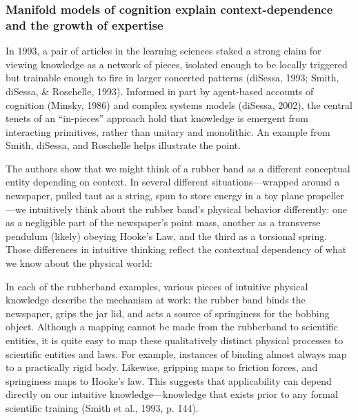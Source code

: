 \subsubsection{Manifold models of cognition explain context-dependence
and the growth of
expertise}\label{manifold-models-of-cognition-explain-context-dependence-and-the-growth-of-expertise}

In 1993, a pair of articles in the learning sciences staked a strong
claim for viewing knowledge as a network of pieces, isolated enough to
be locally triggered but trainable enough to fire in larger concerted
patterns (diSessa, 1993; Smith, diSessa, \& Roschelle, 1993). Informed
in part by agent-based accounts of cognition (Minsky, 1986) and complex
systems models (diSessa, 2002), the central tenets of an ``in-pieces''
approach hold that knowledge is emergent from interacting primitives,
rather than unitary and monolithic. An example from Smith, diSessa, and
Roschelle helps illustrate the point.

The authors show that we might think of a rubber band as a different
conceptual entity depending on context. In several different
situations---wrapped around a newspaper, pulled taut as a string, spun
to store energy in a toy plane propeller---we intuitively think about
the rubber band's physical behavior differently: one as a negligible
part of the newspaper's point mass, another as a transverse pendulum
(likely) obeying Hooke's Law, and the third as a torsional spring. Those
differences in intuitive thinking reflect the contextual dependency of
what we know about the physical world:

In each of the rubberband examples, various pieces of intuitive physical
knowledge describe the mechanism at work: the rubber band binds the
newspaper, grips the jar lid, and acts a source of springiness for the
bobbing object. Although a mapping cannot be made from the rubberband to
scientific entities, it is quite easy to map these qualitatively
distinct physical processes to scientific entities and laws. For
example, instances of binding almost always map to a practically rigid
body. Likewise, gripping maps to friction forces, and springiness maps
to Hooke's law. This suggests that applicability can depend directly on
our intuitive knowledge---knowledge that exists prior to any formal
scientific training (Smith et al., 1993, p. 144).

